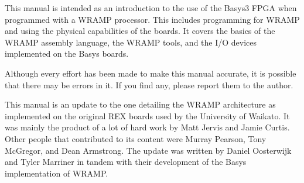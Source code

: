 This manual is intended as an introduction to the use of the Basys3 FPGA when
programmed with a WRAMP processor.
This includes programming for WRAMP and using the physical capabilities of the boards.
It covers the basics of the WRAMP assembly language, the WRAMP tools, and the I/O
devices implemented on the Basys boards.

Although every effort has been made to make this manual accurate, it is
possible that there may be errors in it. If you find any, please report
them to the author.

This manual is an update to the one detailing the WRAMP architecture as
implemented on the original REX boards used by the University of Waikato.
It was mainly the product of a lot of hard work by Matt Jervis
and Jamie Curtis. Other people that contributed to its content
were Murray Pearson, Tony McGregor, and Dean Armstrong.
The update was written by Daniel Oosterwijk and Tyler Marriner in
tandem with their development of the Basys implementation of WRAMP.
